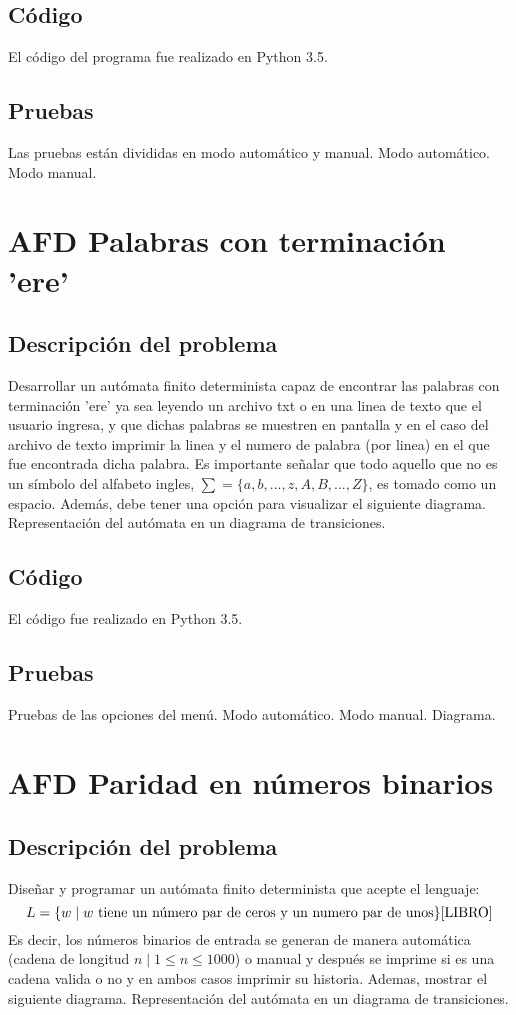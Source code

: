 \documentclass[12pt, titlepage]{article}
\begin{document}
	\subsection{Código}
	El código del programa fue realizado en Python 3.5.
	\subsection{Pruebas}
	Las pruebas están divididas en modo automático y manual.
	{\large Modo automático.}
	{\large Modo manual.}
	
	\section{AFD Palabras con terminación 'ere'}
	\subsection{Descripción del problema}
	Desarrollar un autómata finito determinista capaz de encontrar las palabras con terminación 'ere' ya sea leyendo un archivo txt o en una linea de texto que el usuario ingresa, y que dichas palabras se muestren en pantalla y en el caso del archivo de texto imprimir la linea y el numero de palabra (por linea) en el que fue encontrada dicha palabra.
	Es importante señalar que todo aquello que no es un símbolo del alfabeto ingles, $ \sum =\lbrace a, b, ..., z, A, B, ..., Z \rbrace $, es tomado como un espacio. Además, debe tener una opción para visualizar el siguiente diagrama.
	Representación del autómata en un diagrama de transiciones.
	\subsection{Código}
	El código fue realizado en Python 3.5.
	\subsection{Pruebas}
	Pruebas de las opciones del menú.
	{\large Modo automático.}
	{\large Modo manual.}
	{\large Diagrama.}
	
	\section{AFD Paridad en números binarios}
	\subsection{Descripción del problema}
	Diseñar y programar un autómata finito determinista que acepte el lenguaje:
	\[ L = \lbrace w \mid w \text{ tiene un número par de ceros y un numero par de unos} \rbrace \text{\cite{LIBRO}}\] 
	Es decir, los números binarios de entrada se generan de manera automática (cadena de longitud $n \mid 1\leq n \leq 1000$) o manual y después se imprime si es una cadena valida o no y en ambos casos imprimir su historia. Ademas, mostrar el siguiente diagrama.
	Representación del autómata en un diagrama de transiciones. \cite{LIBRO}
\end{document}
